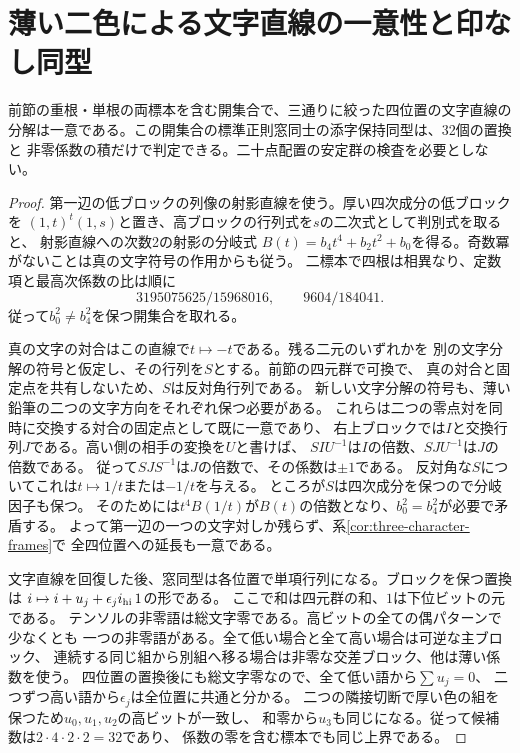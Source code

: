 \section{薄い二色による文字直線の一意性と印なし同型}
\label{sec:unique-character-frames}
\begin{theorem}\label{thm:unique-character-frames}
前節の重根・単根の両標本を含む開集合で、三通りに絞った四位置の文字直線の
分解は一意である。この開集合の標準正則窓同士の添字保持同型は、32個の置換と
非零係数の積だけで判定できる。二十点配置の安定群の検査を必要としない。
\end{theorem}
\begin{proof}
第一辺の低ブロックの列像の射影直線を使う。厚い四次成分の低ブロックを
$(1,t)^t(1,s)$と置き、高ブロックの行列式を$s$の二次式として判別式を取ると、
射影直線への次数2の射影の分岐式
$B(t)=b_4t^4+b_2t^2+b_0$を得る。奇数冪がないことは真の文字符号の作用からも従う。
二標本で四根は相異なり、定数項と最高次係数の比は順に
\[
 3195075625/15968016,\qquad 9604/184041 .
\]
従って$b_0^2\ne b_4^2$を保つ開集合を取れる。

真の文字の対合はこの直線で$t\mapsto-t$である。残る二元のいずれかを
別の文字分解の符号と仮定し、その行列を$S$とする。前節の四元群で可換で、
真の対合と固定点を共有しないため、$S$は反対角行列である。
新しい文字分解の符号も、薄い鉛筆の二つの文字方向をそれぞれ保つ必要がある。
これらは二つの零点対を同時に交換する対合の固定点として既に一意であり、
右上ブロックでは$I$と交換行列$J$である。高い側の相手の変換を$U$と書けば、
$SIU^{-1}$は$I$の倍数、$SJU^{-1}$は$J$の倍数である。
従って$SJS^{-1}$は$J$の倍数で、その係数は$\pm1$である。
反対角な$S$についてこれは$t\mapsto 1/t$または$-1/t$を与える。
ところが$S$は四次成分を保つので分岐因子も保つ。
そのためには$t^4B(1/t)$が$B(t)$の倍数となり、$b_0^2=b_4^2$が必要で矛盾する。
よって第一辺の一つの文字対しか残らず、系\ref{cor:three-character-frames}で
全四位置への延長も一意である。

文字直線を回復した後、窓同型は各位置で単項行列になる。ブロックを保つ置換は
$ i\mapsto i+u_j+\epsilon_j i_{\rm hi}\,1$の形である。
ここで和は四元群の和、$1$は下位ビットの元である。
テンソルの非零語は総文字零である。高ビットの全ての偶パターンで少なくとも
一つの非零語がある。全て低い場合と全て高い場合は可逆な主ブロック、
連続する同じ組から別組へ移る場合は非零な交差ブロック、他は薄い係数を使う。
四位置の置換後にも総文字零なので、全て低い語から$\sum u_j=0$、
二つずつ高い語から$\epsilon_j$は全位置に共通と分かる。
二つの隣接切断で厚い色の組を保つため$u_0,u_1,u_2$の高ビットが一致し、
和零から$u_3$も同じになる。従って候補数は$2\cdot4\cdot2\cdot2=32$であり、
係数の零を含む標本でも同じ上界である。


\end{proof}

